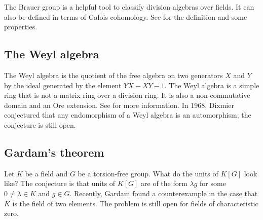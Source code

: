 The Brauer group is a helpful tool to classify division algebras over fields. It can also be defined in terms of Galois cohomology. 
See \cite{MR1233388} for the definition and some properties. 

\subsection*{The Weyl algebra}

The Weyl algebra is the quotient of the free algebra on two generators
$X$ and $Y$ by the ideal generated by the element
$YX-XY-1$. The Weyl algebra is a simple ring that is 
not a matrix ring over a division ring. It is also a non-commutative domain and an Ore extension. See \cite{MR1838439} for more information. 
In 1968, Dixmier conjectured that any 
endomorphism of a Weyl algebra is an automorphism; the conjecture
is still open. 

\subsection*{Gardam's theorem}

Let $K$ be a field and $G$ be a torsion-free group. 
What do the units of $K[G]$ look like? The conjecture
is that units of $K[G]$ are of the form $\lambda g$ for
some $0\ne\lambda\in K$ and $g\in G$. Recently, 
Gardam \cite{MR4334981} found a counterexample 
in the case that 
$K$ is the field of two elements. The problem is still
open for fields of characteristic zero. 





% 
